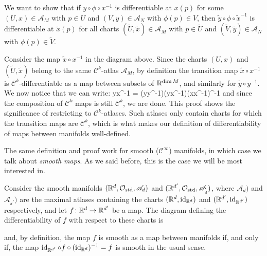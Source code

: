 \bq
We want to show that if $y\circ\phi\circ x^{-1}$ is differentiable at $x(p)$ for some $(U,x)\in\mathscr{A}_M$ with $p\in U$ and $(V,y)\in\mathscr{A}_N$ with $\phi(p)\in V$, then $\widetilde y\circ\phi\circ \widetilde x^{-1}$ is differentiable at $\widetilde x(p)$ for all charts $(\widetilde U,\widetilde x)\in\mathscr{A}_M$ with $p\in \widetilde U$ and $(\widetilde V,\widetilde y)\in\mathscr{A}_N$ with $\phi(p)\in \widetilde V$.
\bse
{}
\ese
Consider the map $\widetilde x\circ x^{-1}$ in the diagram above. Since the charts $(U,x)$ and $(\widetilde U,\widetilde x)$ belong to the same $\mathcal{C}^k$-atlas $\mathscr{A}_M$, by definition the transition map $\widetilde x\circ x^{-1}$ is $\mathcal{C}^k$-differentiable as a map between subsets of $\mathbb{R}^{\dim M}$, and similarly for $\widetilde y\circ y^{-1}$. We now notice that we can write:
\bse
\widetilde y\circ\phi\circ \widetilde x^{-1} = (\widetilde y\circ y^{-1})\circ(y\circ\phi\circ x^{-1})\circ(\widetilde x\circ x^{-1})^{-1}
\ese
and since the composition of $\mathcal{C}^k$ maps is still $\mathcal{C}^k$, we are done.
\eq
This proof shows the significance of restricting to $\mathcal{C}^k$-atlases. Such atlases only contain charts for which the transition maps are $\mathcal{C}^k$, which is what makes our definition of differentiability of maps between manifolds well-defined.

The same definition and proof work for smooth ($\mathcal{C}^\infty$) manifolds, in which case we talk about \emph{smooth maps}. As we said before, this is the case we will be most interested in.

\be
Consider the smooth manifolds $(\mathbb{R}^d,\mathcal{O}_\mathrm{std},\mathscr{A}_d)$ and $(\mathbb{R}^{d'},\mathcal{O}_\mathrm{std},\mathscr{A}_{_d'})$, where $\mathscr{A}_d)$ and $\mathscr{A}_{_d'})$ are the maximal atlases containing the charts $(\mathbb{R}^d,\operatorname{id}_{\mathbb{R}^d})$ and $(\mathbb{R}^{d'},\operatorname{id}_{\mathbb{R}^{d'}})$ respectively, and let $f\colon \mathbb{R}^{d}\to \mathbb{R}^{d'}$ be a map. The diagram defining the differentiability of $f$ with respect to these charts is
\bse
{}
\ese
and, by definition, the map $f$ is smooth as a map between manifolds if, and only if, the map $\operatorname{id}_{\mathbb{R}^{d'}}\circ f\circ (\operatorname{id}_{\mathbb{R}^d})^{-1}=f$ is smooth in the usual sense.
\ee


